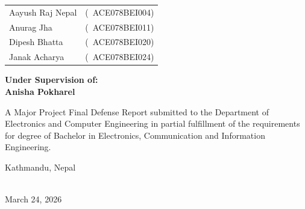 \documentclass[../main.tex]{subfiles}
\begin{document}
\begin{titlepage}
\begin{center}
        \begin{table}[ht]
            \centering
            \begin{tabular}{ll}
            Aayush Raj Nepal      & (\ ACE078BEI004)      \\
            Anurag Jha        & (\ ACE078BEI011)     \\
            Dipesh Bhatta     & (\ ACE078BEI020)    \\
            Janak Acharya     & (\ ACE078BEI024)  \\
            \end{tabular}
        \end{table}
        \textbf{Under Supervision of:}\\
        \textbf{Anisha Pokharel}

       \vspace{0.45cm}
        
        

         \begin{small}
            A Major Project Final Defense Report submitted to the Department of Electronics and Computer Engineering in partial fulfillment of the requirements for degree of Bachelor in Electronics, Communication and Information Engineering.
            \begin{center}
            Kathmandu, Nepal\\\
            
            
            March 24, 2026
            \end{center}
        \end{small}
    \end{center}
    
    \vspace*{\fill} %
    \end{titlepage}
    
\end{document}
